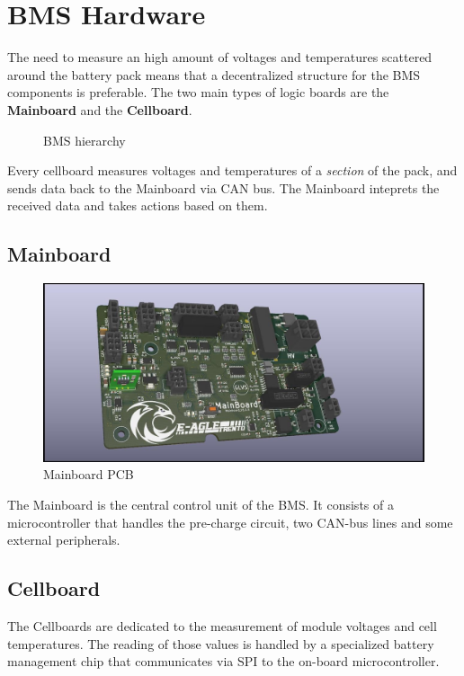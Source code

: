 \chapter{BMS Hardware}
The need to measure an high amount of voltages and temperatures scattered around the battery pack means that a decentralized structure for the BMS components is preferable. The two main types of logic boards are the \textbf{Mainboard} and the \textbf{Cellboard}.
\begin{figure}[h]
    \centering
    
    \caption{BMS hierarchy}
    \label{fig:bms_hierarchy}
\end{figure}
Every cellboard measures voltages and temperatures of a \textsl{section} of the pack, and sends data back to the Mainboard via CAN bus. The Mainboard inteprets the received data and takes actions based on them.


\section{Mainboard}
\begin{figure}[h]
    \centering
    \includegraphics[scale=0.5]{pictures/mainboard.jpg}
    \caption{Mainboard PCB}
    \label{fig:mainboard}
\end{figure}
The Mainboard is the central control unit of the BMS. It consists of a microcontroller that handles the pre-charge circuit, two CAN-bus lines and some external peripherals.


\section{Cellboard}
The Cellboards are dedicated to the measurement of module voltages and cell temperatures. The reading of those values is handled by a specialized battery management chip that communicates via SPI to the on-board microcontroller.


